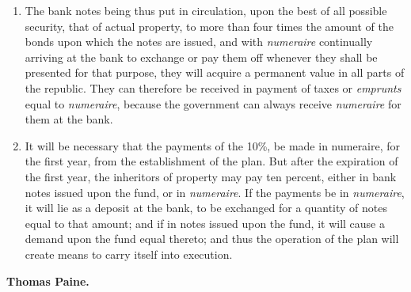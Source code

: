\begin{enumerate}
	\item The bank notes being thus put in circulation, upon the best of all possible security, that of actual property, to more than four times the amount of the bonds upon which the notes are issued, and with \emph{numeraire} continually arriving at the bank to exchange or pay them off whenever they shall be presented for that purpose, they will acquire a permanent value in all parts of the republic. They can therefore be received in payment of taxes or \emph{emprunts} equal to \emph{numeraire}, because the government can always receive \emph{numeraire} for them at the bank.

	\item It will be necessary that the payments of the 10\%, be made in numeraire, for the first year, from the establishment of the plan. But after the expiration of the first year, the inheritors of property may pay ten percent, either in bank notes issued upon the fund, or in \emph{numeraire}. If the payments be in \emph{numeraire}, it will lie as a deposit at the bank, to be exchanged for a quantity of notes equal to that amount; and if in notes issued upon the fund, it will cause a demand upon the fund equal thereto; and thus the operation of the plan will create means to carry itself into execution.

\end{enumerate}

\textbf{Thomas Paine.}




